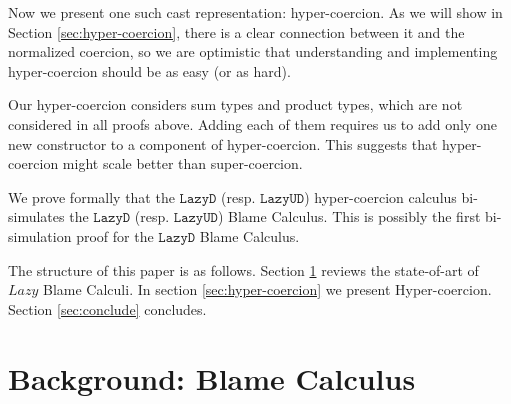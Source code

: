 \documentclass[acmsmall,review,anonymous]{acmart}\settopmatter{printfolios=true,printccs=false,printacmref=false}
\newcommand{\lazyUD}{$\mathtt{Lazy UD}$}
\newcommand{\lazyD}{$\mathtt{Lazy D}$}
\begin{document}
Now we present one such cast representation: hyper-coercion. As we will show in 
Section \ref{sec:hyper-coercion}, there is a clear connection between it and 
the normalized coercion, so we are optimistic that understanding and 
implementing hyper-coercion should be as easy (or as hard).

Our hyper-coercion considers sum types and product types, which are not 
considered in all proofs above. Adding each of them requires us to add only one 
new constructor to a component of hyper-coercion. This suggests that 
hyper-coercion might scale better than super-coercion.

We prove formally that the \lazyD{} (resp. \lazyUD{}) hyper-coercion calculus 
bi-simulates the \lazyD{} (resp. \lazyUD{}) Blame Calculus. This is possibly 
the first bi-simulation proof for the \lazyD{} Blame Calculus.

The structure of this paper is as follows. 
Section \ref{sec:blame-calculus} reviews the state-of-art of $Lazy$ Blame 
Calculi. 
In section \ref{sec:hyper-coercion} we present Hyper-coercion.
Section \ref{sec:conclude} concludes.

\section{Background: Blame Calculus} \label{sec:blame-calculus}
\end{document}
